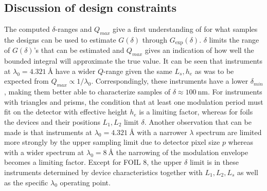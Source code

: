 \subsection{Discussion of design constraints}
The computed $\delta$-ranges and $Q_{max}$ give a first understanding of for what samples the designs can be used to estimate $G(\delta)$ through $G_{\text{exp}}(\delta)$. $\delta$ limits the range of $G(\delta)$'s that can be estimated and $Q_{max}$ gives an indication of how well the bounded integral will approximate the true value. It can be seen that instruments at $\lambda_0 = \SI{4.321}{\angstrom}$ have a wider $Q$-range given the same $L_s, h_e$ as was to be expected from $Q_{max} \propto 1/\lambda_0$. Correspondingly, these instruments have a lower $\delta_{min}$, making them better able to characterize samples of $\delta \approx \SI{100}{\nano\meter}$. For instruments with triangles and prisms, the condition that at least one modulation period must fit on the detector with effective height $h_e$ is a limiting factor, whereas for foils the devices and their positions $L_1, L_2$ limit $\delta$. Another observation that can be made is that instruments at $\lambda_0 = \SI{4.321}{\angstrom}$ with a narrower $\lambda$ spectrum are limited more strongly by the upper sampling limit due to detector pixel size $p$ whereas with a wider spectrum at $\lambda_0 = \SI{8}{\angstrom}$ the narrowing of the modulation envelope becomes a limiting factor. Except for FOIL 8, the upper $\delta$ limit is in these instruments determined by device characteristics together with $L_1, L_2, L_s$ as well as the specific $\lambda_0$ operating point. 

